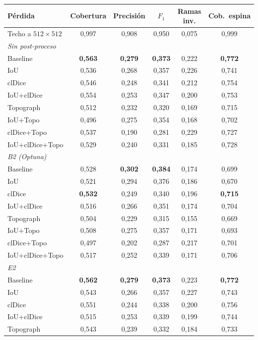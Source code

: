 \begin{table}[htbp]
\centering
\small
\begin{tabular}{@{}lccccc@{}}
\toprule
Pérdida & Cobertura & Precisión & $F_1$ & Ramas inv. & Cob.\ espina\\
\midrule
Techo a $512\times512$ & 0,997 & 0,908 & 0,950 & 0,075 & 0,999\\
\midrule
\multicolumn{6}{l}{\emph{Sin post-proceso}}\\
Baseline & \textbf{0,563} & \textbf{0,279} & \textbf{0,373} & 0,222 & \textbf{0,772}\\
IoU & 0,536 & 0,268 & 0,357 & 0,226 & 0,741\\
clDice & 0,546 & 0,248 & 0,341 & 0,212 & 0,754\\
IoU+clDice & 0,554 & 0,253 & 0,347 & 0,200 & 0,753\\
Topograph & 0,512 & 0,232 & 0,320 & 0,169 & 0,715\\
IoU+Topo & 0,496 & 0,275 & 0,354 & 0,168 & 0,702\\
clDice+Topo & 0,537 & 0,190 & 0,281 & 0,229 & 0,727\\
IoU+clDice+Topo & 0,529 & 0,240 & 0,331 & 0,185 & 0,728\\
\midrule
\multicolumn{6}{l}{\emph{B2 (Optuna)}}\\
Baseline & 0,528 & \textbf{0,302} & \textbf{0,384} & 0,174 & 0,699\\
IoU & 0,521 & 0,294 & 0,376 & 0,186 & 0,670\\
clDice & \textbf{0,532} & 0,249 & 0,340 & 0,196 & \textbf{0,715}\\
IoU+clDice & 0,516 & 0,266 & 0,351 & 0,174 & 0,704\\
Topograph & 0,504 & 0,229 & 0,315 & 0,155 & 0,669\\
IoU+Topo & 0,508 & 0,275 & 0,357 & 0,171 & 0,693\\
clDice+Topo & 0,497 & 0,202 & 0,287 & 0,217 & 0,701\\
IoU+clDice+Topo & 0,517 & 0,252 & 0,339 & 0,171 & 0,706\\
\midrule
\multicolumn{6}{l}{\emph{E2}}\\
Baseline & \textbf{0,562} & \textbf{0,279} & \textbf{0,373} & 0,223 & \textbf{0,772}\\
IoU & 0,543 & 0,266 & 0,357 & 0,227 & 0,743\\
clDice & 0,551 & 0,244 & 0,338 & 0,200 & 0,756\\
IoU+clDice & 0,515 & 0,253 & 0,339 & 0,199 & 0,744\\
Topograph & 0,543 & 0,239 & 0,332 & 0,184 & 0,733\\

\end{tabular}
\end{table}
